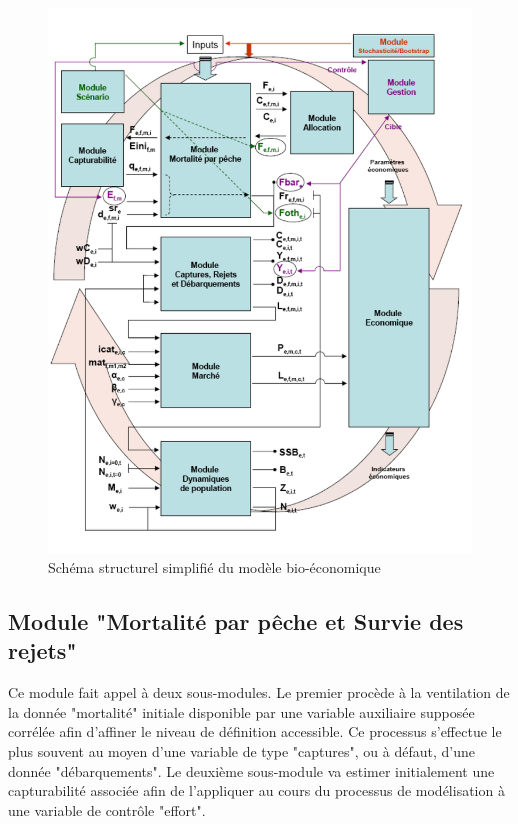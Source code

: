 \documentclass[12pt, colorinlistoftodos, notitlepage]{report}
\newenvironment{not used}[1]{%
    \longtable{%
        |>{\centering$\displaystyle}A{#1}{1}<{$}%
        |}\hline\ignorespaces}{%
    \endlongtable\ignorespacesafterend}
\begin{document}
\begin{figure}
\begin{center}
\includegraphics[width = 17cm]{figures/schema.png}
\end{center}
\caption{Schéma structurel simplifié du modèle bio-économique}
\label{fig:schema}
\end{figure}


\subsection{Module "Mortalité par pêche et Survie des rejets"}

Ce module fait appel à deux sous-modules. Le premier procède à la ventilation de la donnée "mortalité" initiale disponible par une variable auxiliaire supposée corrélée afin d’affiner le niveau de définition accessible. Ce processus s’effectue le plus souvent au moyen d’une variable de type "captures", ou à défaut, d’une donnée "débarquements". Le deuxième sous-module va estimer initialement une capturabilité associée afin de l’appliquer au cours du processus de modélisation à une variable de contrôle "effort". 
\end{document}

